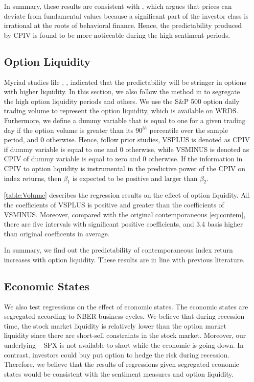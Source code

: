 In summary, these results are consistent with \textcite{baker2006investor}, which argues that prices can deviate from fundamental values because a significant part of the investor class is irrational at the roots of behavioral finance. Hence, the predictability produced by CPIV is found to be more noticeable during the high sentiment periods.  

\subsection{Option Liquidity}

Myriad studies lile \textcite{easley1998option}, \textcite{cremers2010deviations}, \textcite{driessen2012option} indicated that the predictability will be stringer in options with higher liquidity. In this section, we also follow the method in \textcite{chang2018implied} to segregate the high option liquidity periods and others. We use the S\&P 500 option daily trading volume to represent the option liquidity, which is available on WRDS. Furhermore, we define a dummy variable that is equal to one for a given trading day if the option volume is greater than its $90^{th}$ percentile over the sample period, and 0 otherwise. Hence, follow prior studies, VSPLUS is denoted as CPIV if dummy variable is equal to one and 0 otherwise, while VSMINUS is denoted as CPIV of dummy variable is equal to zero and 0 otherwise. If the information in CPIV to option liquidity is instrumental in the predictive power of the CPIV on index returns, then $\beta _{1}$ is expected to be positive and larger than $\beta _{2}$.

\autoref{table:Volume} describes the regression results on the effect of option liquidity. All the coefficients of VSPLUS is positive and greater than the coefficients of VSMINUS. Moreover, compared with the original contemporaneous \autoref{eq:contem}, there are five intervals with significant positive coefficients, and 3.4 basis higher than original coefficents in average. 

In summary, we find out the predictability of contemporaneous index return increases with option liquidity. These results are in line with previous literature. 

\subsection{Economic States}

We also test regressions on the effect of economic states. The economic states are segregated according to NBER business cycles. We believe that during recession time, the stock market liquidity is relatively lower than the option market liquidity since there are short-sell constraints in the stock market. Moreover, our underlying -- SPX is not available to short while the economic is going down. In contrast, investors could buy put option to hedge the risk during recession. Therefore, we believe that the results of regressions given segregated economic states would be consistent with the sentiment measures and option liquidity.  

